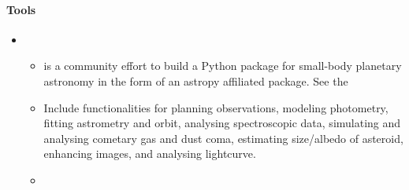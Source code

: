 \documentclass[letterpaper,10pt,english]{sphinxmanual}
\begin{document}
\paragraph{Tools}
\label{\detokenize{resource/astro/topics/solar_system:tools}}\begin{itemize}
\item {} 
\begin{itemize}
\item {} 
 is a community effort to build a Python package for
small-body planetary astronomy in the form of an astropy
affiliated package. See the 

\item {} 
Include functionalities for planning observations, modeling
photometry, fitting astrometry and orbit, analysing spectroscopic
data, simulating and analysing cometary gas and dust coma,
estimating size/albedo of asteroid, enhancing images, and
analysing lightcurve.

\item {} 

\end{itemize}

\end{itemize}
\end{document}
